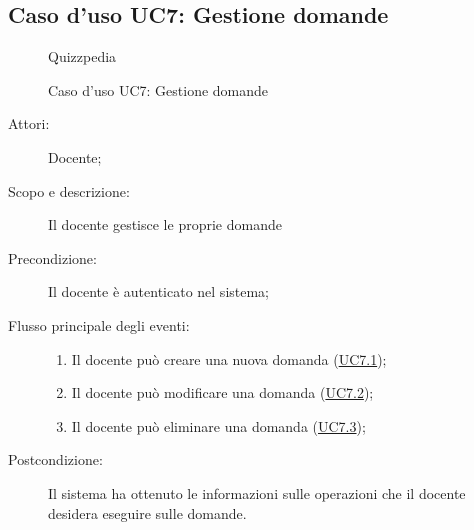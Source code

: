 \subsection{Caso d'uso UC7: Gestione domande}
        \begin{figure}[H]
            \centering
            \begin{resizedtikzpicture}{\textwidth}
		\begin{umlsystem}[x=0, fill=lightgray!20]{Quizzpedia}
		\end{umlsystem}
            \end{resizedtikzpicture}
            \caption{Caso d'uso UC7: Gestione domande}
            \label{fig:UC7} 
        \end{figure}
    \begin{description}
\item[Attori:] Docente;
\item[Scopo e descrizione:] Il docente gestisce le proprie domande
      \item[Precondizione:] Il docente è autenticato nel sistema;

        \item[Flusso principale degli eventi:] \begin{enumerate}
          \item Il docente può creare una nuova domanda (\hyperlink{UC7.1}{UC7.1});
          \item Il docente può modificare una domanda (\hyperlink{UC7.2}{UC7.2});
          \item Il docente può eliminare una domanda (\hyperlink{UC7.3}{UC7.3});

      \end{enumerate}
    \item[Postcondizione:] Il sistema ha ottenuto le informazioni sulle operazioni che il docente desidera eseguire sulle domande.
  \end{description}
\hypertarget{UC7.1}{}
